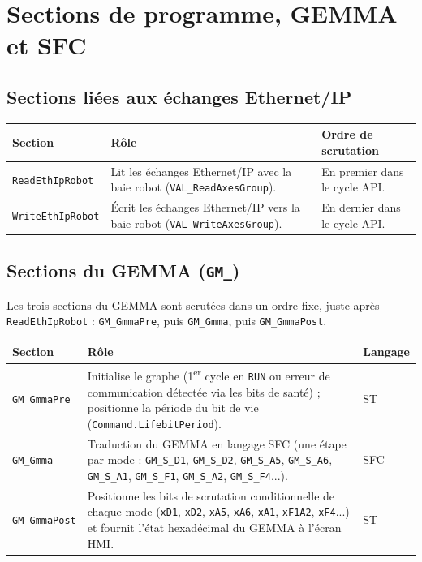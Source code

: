 \section{Sections de programme, GEMMA et SFC}
\label{secSectionsGmma}

\subsection{Sections liées aux échanges Ethernet/IP}

\begin{center}
    \begin{tabular}{|p{4cm}|p{7cm}|p{3.2cm}|}
        \hline
        \textbf{Section} & \textbf{Rôle} & \textbf{Ordre de scrutation} \\
        \hline
        \texttt{ReadEthIpRobot} & Lit les échanges Ethernet/IP avec la baie robot (\texttt{VAL\_ReadAxesGroup}). & En premier dans le cycle API. \\
        \hline
        \texttt{WriteEthIpRobot} & Écrit les échanges Ethernet/IP vers la baie robot (\texttt{VAL\_WriteAxesGroup}). & En dernier dans le cycle API. \\
        \hline
    \end{tabular}
\end{center}

\subsection{Sections du GEMMA (\texttt{GM\_})}

Les trois sections du GEMMA sont scrutées dans un ordre fixe, juste après \texttt{ReadEthIpRobot} :
\texttt{GM\_GmmaPre}, puis \texttt{GM\_Gmma}, puis \texttt{GM\_GmmaPost}.

\begin{center}
    \begin{tabular}{|p{3cm}|p{9.4cm}|p{2cm}|}
        \hline
        \textbf{Section} & \textbf{Rôle} & \textbf{Langage} \\
        \hline
        \texttt{GM\_GmmaPre} & Initialise le graphe (1\textsuperscript{er} cycle en \texttt{RUN} ou erreur de communication détectée via les bits de santé) ; positionne la période du bit de vie (\texttt{Command.LifebitPeriod}). & ST \\
        \hline
        \texttt{GM\_Gmma} & Traduction du GEMMA en langage SFC (une étape par mode : \texttt{GM\_S\_D1}, \texttt{GM\_S\_D2}, \texttt{GM\_S\_A5}, \texttt{GM\_S\_A6}, \texttt{GM\_S\_A1}, \texttt{GM\_S\_F1}, \texttt{GM\_S\_A2}, \texttt{GM\_S\_F4}...). & SFC \\
        \hline
        \texttt{GM\_GmmaPost} & Positionne les bits de scrutation conditionnelle de chaque mode (\texttt{xD1}, \texttt{xD2}, \texttt{xA5}, \texttt{xA6}, \texttt{xA1}, \texttt{xF1A2}, \texttt{xF4}...) et fournit l'état hexadécimal du GEMMA à l'écran HMI. & ST \\
        \hline
    \end{tabular}
\end{center}

